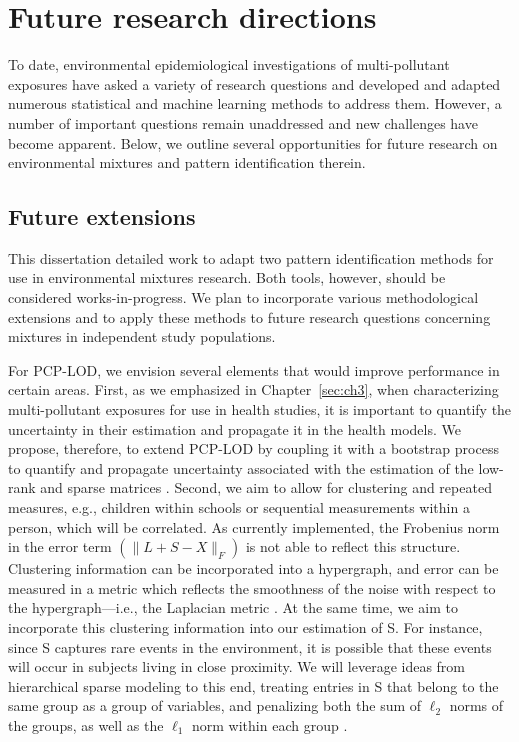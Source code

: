 \section{Future research directions}\label{sec:future}
To date, environmental epidemiological investigations of multi-pollutant exposures have asked a variety of research questions and developed and adapted numerous statistical and machine learning methods to address them. However, a number of important questions remain unaddressed and new challenges have become apparent. Below, we outline several opportunities for future research on environmental mixtures and pattern identification therein.

\subsection{Future extensions}\label{diss:future}
This dissertation detailed work to adapt two pattern identification methods for use in environmental mixtures research. Both tools, however, should be considered works-in-progress. We plan to incorporate various methodological extensions and to apply these methods to future research questions concerning mixtures in independent study populations.

For PCP-LOD, we envision several elements that would improve performance in certain areas. First, as we emphasized in Chapter~\ref{sec:ch3}, when characterizing multi-pollutant exposures for use in health studies, it is important to quantify the uncertainty in their estimation and propagate it in the health models. We propose, therefore, to extend PCP-LOD by coupling it with a bootstrap process to quantify and propagate uncertainty associated with the estimation of the low-rank and sparse matrices \citep{mak14_unc}. Second, we aim to allow for clustering and repeated measures, e.g., children within schools or sequential measurements within a person, which will be correlated. As currently implemented, the Frobenius norm in the error term $\left( \|L+S-X\|_{F} \right)$ is not able to reflect this structure. Clustering information can be incorporated into a hypergraph, and error can be measured in a metric which reflects the smoothness of the noise with respect to the hypergraph---i.e., the Laplacian metric \citep{zhou2006learning, kaminski2019clustering}. At the same time, we aim to incorporate this clustering information into our estimation of S. For instance, since S captures rare events in the environment, it is possible that these events will occur in subjects living in close proximity. We will leverage ideas from hierarchical sparse modeling to this end, treating entries in S that belong to the same group as a group of variables, and penalizing both the sum of $\ell_2$ norms of the groups, as well as the $\ell_1$ norm within each group \citep{yan2017hierarchical, sprechmann2011c, jenatton2011proximal}.

